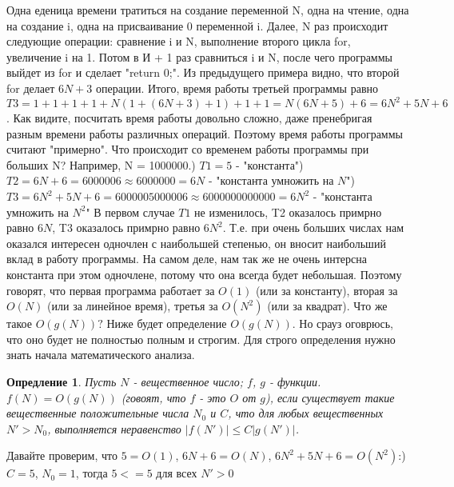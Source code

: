 \documentclass[a4paper,12pt]{article}
\newtheorem{definition}{Опредление} %
\begin{document}
Одна еденица времени тратиться на создание переменной N, одна на чтение, одна на создание i, одна на присваивание 0 переменной i. Далее, N раз
происходит следующие операции: сравнение i и N, выполнение второго цикла for, увеличение i на 1. Потом в И + 1 раз сравниться i и N, после чего
программы выйдет из for и сделает "return 0;". Из предыдущего примера видно, что второй for делает $6N + 3$ операции. Итого, время работы третьей
программы равно $T3 = 1 + 1 + 1 + 1 + N(1 + (6N + 3) + 1) + 1 + 1 = N(6N + 5) + 6 = 6N^2 + 5N + 6$.\newline
Как видите, посчитать время работы довольно сложно, даже пренебригая разным времени работы различных операций. Поэтому время работы программы
считают "примерно".\newline
Что происходит со временем работы программы при больших N? Например, N = 1000000.) $T1 = 5$ - "константа") $T2 = 6N + 6 = 6000006 \approx 6000000 = 6N$ - "константа умножить на $N$") $T3 = 6N^2 + 5N + 6 = 6000005000006 \approx 6000000000000 = 6N^2$ - "константа умножить на $N^2$"\newline
В первом случае $T1$ не изменилось, T2 оказалось примрно равно $6N$, T3 оказалось примрно равно $6N^2$. Т.е. при очень больших числах нам
оказался интересен одночлен с наибольшей степенью, он вносит наибольший вклад в работу программы. На самом деле, нам так же не очень интерсна
константа при этом одночлене, потому что она всегда будет небольшая. Поэтому говорят, что первая программа работает за $O(1)$ (или за константу),
вторая за $O(N)$ (или за линейное время), третья за $O(N^2)$ (или за квадрат). Что же такое $O(g(N))?$\newline
Ниже будет определение $O(g(N))$. Но срауз оговрюсь, что оно будет не полностью полным и строгим. Для строго определения нужно знать начала
математического анализа.\newline
\begin{definition}
Пусть $N$ - вещественное число; $f$, $g$ - функции.
$f(N) = O(g(N))$ (говоят, что $f$ - это $O$ от $g$), если существует такие вещественные положительные числа $N_0$ и $C$, что для любых
вещественных $N' > N_0$, выполняется неравенство $|f(N')| \le C|g(N')|$.
\end{definition}
Давайте проверим, что $5 = O(1)$, $6N + 6 = O(N)$, $6N^2 + 5N + 6 = O(N^2)$:) $C = 5$, $N_0 = 1$, тогда $5 <= 5$ для всех $N' > 0$\newline
\end{document}
